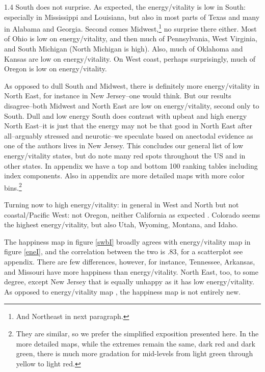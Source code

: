 \documentclass[10pt, letterpaper]{article}
\begin{document}
\begin{spacing}{1.4}
South does not surprise. As expected, the energy/vitality is low in South:
especially in  Mississippi and Louisiana, but also in most parts of Texas and
many in Alabama and Georgia. Second comes Midwest,\footnote{And Northeast in next
paragraph.} no surprise there either. Most of Ohio is
low on energy/vitality, and then much of Pennsylvania, West Virginia, 
and South Michigan (North Michigan is high). 
Also, much of  Oklahoma and Kansas are low on energy/vitality. On West coast, perhaps
 surprisingly, much of Oregon is low on energy/vitality.
 
As opposed to dull South and Midwest, there is definitely more energy/vitality
in North East, for instance in New Jersey--one would think. But our results
disagree--both Midwest and North East are low on energy/vitality, second only to
South. Dull and low energy South does contrast
with upbeat and high energy North East--it is just that the energy may not be
that good in North East after all--arguably stressed and neurotic--we speculate
based on anectodal evidence as one of the authors lives in New Jersey. This concludes our general
list of low energy/vitality states, but do note many red spots throughout the US
and in other states. In appendix we have a top and bottom 100 ranking tables
 including index components. Also in appendix are more detailed maps with more
 color bins.\footnote{They are similar, so we prefer the simplified exposition
   presented here. In the more detailed maps, while the extremes remain the
   same, dark red and dark green, there is much more gradation for mid-levels
   from light green through yellow to light red.}  

Turning now to high energy/vitality: in general in West and North but not
coastal/Pacific West: not Oregon, neither 
California as expected \citep{schkade98k}. Colorado seems the highest
energy/vitality, but also Utah, Wyoming, Montana, and Idaho. 



The happiness map in figure \ref{swbI} broadly agrees with energy/vitality map
in figure \ref{eneI}, and the correlation between the two is .83, for a
scatterplot see appendix. There are few differences, however, for instance, Tennessee,
Arkansas, and Missouri have more happiness than energy/vitality. North East,
too, to some degree, except New Jersey that is equally unhappy as it has low energy/vitality.  
As opposed to energy/vitality map%
,
 the happiness map %
 is not entirely new. 


\end{spacing}
\end{document}
